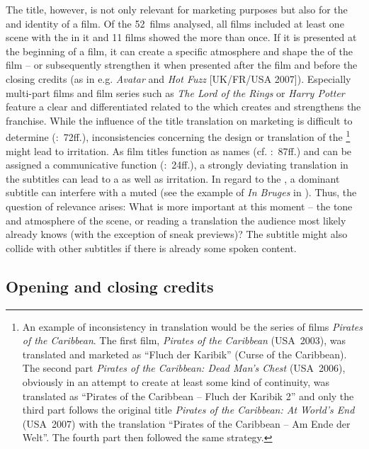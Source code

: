 The title, however, is not only relevant for marketing purposes but also for the  and identity of a film. Of the 52~films analysed, all films included at least one scene with the  in it and 11 films showed the  more than once. If it is presented at the beginning of a film, it can create a specific atmosphere and shape the  of the film – or subsequently strengthen it when presented after the film and before the closing credits (as in e.g. \textit{Avatar} and \textit{Hot Fuzz} [UK/FR/USA 2007]). Especially multi-part films and film series such as \textit{The Lord of the Rings} or \textit{Harry Potter} feature a clear and differentiated  related to the  which creates  and strengthens the franchise. While the influence of the title translation on marketing is difficult to determine (\citealt{schreitmuller1994}:~72ff.), inconsistencies concerning the design or translation of the \footnote{An example of inconsistency in translation would be the series of films \textit{Pirates of the Caribbean}. The first film, \textit{Pirates of the Caribbean} (USA~2003), was translated and marketed as “Fluch der Karibik” (Curse of the Caribbean). The second part \textit{Pirates of the Caribbean: Dead Man’s Chest} (USA~2006), obviously in an attempt to create at least some kind of continuity, was translated as “Pirates of the Caribbean – Fluch der Karibik 2” and only the third part follows the original title \textit{Pirates of the Caribbean: At World’s End} (USA~2007) with the translation “Pirates of the Caribbean – Am Ende der Welt”. The fourth part then followed the same strategy.} might lead to irritation. As film titles function as names (cf. \citealt{nord1993}:~87ff.) and can be assigned a communicative function (\citealt{Bouchehri2008}:~24ff.), a strongly deviating translation in the subtitles can lead to a  as well as irritation. In regard to the , a dominant subtitle can interfere with a muted  (see the example of \textit{In Bruges} in ). Thus, the question of relevance arises: What is more important at this moment – the tone and atmosphere of the scene, or reading a  translation the audience most likely already knows (with the exception of sneak previews)? The subtitle might also collide with other subtitles if there is already some spoken content.

\subsection{Opening and closing credits}\label{sec:2.4.2}

